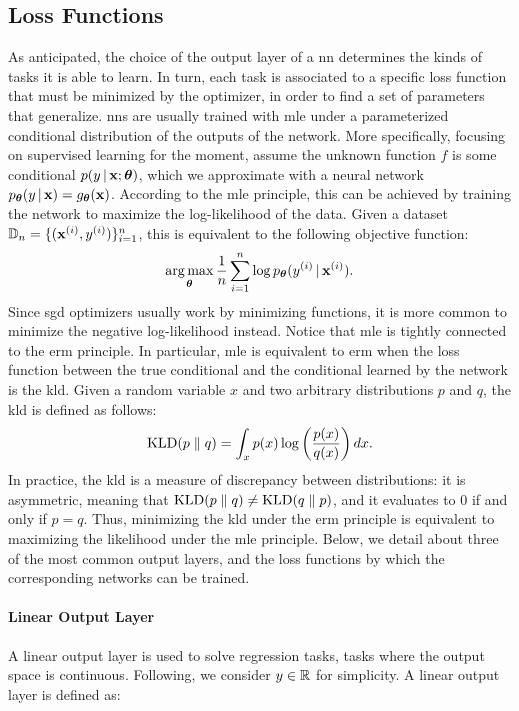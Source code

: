 \subsection{Loss Functions}\label{sec:loss}
As anticipated, the choice of the output layer of a \gls{nn} determines
the kinds of tasks it is able to learn. In turn, each task is associated to a specific loss function that must be minimized by the optimizer, in order to find a set of parameters that generalize. \glspl{nn}
are usually trained with \gls{mle} under a parameterized conditional distribution of the outputs of the network. More specifically, focusing on supervised learning for the moment, assume the unknown function $f$ is some conditional $p(y\given \Vector{x}; \Param)$, which we approximate with a neural network $p_{\Param}(y \given \Vector{x}) = g_{\Param}(\Vector{x})$. According to the \gls{mle} principle, this can be achieved by training the network to maximize the log-likelihood of the data. Given a dataset $\Data_n = \Set{(\VPattern{x}{i}, \Pattern{y}{i})}_{i=1}^n$, this is equivalent to the following objective function:
$$\argmax_{\Param} \frac{1}{n} \sum_{i=1}^n \log p_{\Param}(\Pattern{y}{i} \given \VPattern{x}{i}).$$
Since \gls{sgd} optimizers usually work by minimizing functions, it is more common to minimize the negative log-likelihood instead. Notice that \gls{mle} is tightly connected to the \gls{erm} principle. In particular, \gls{mle} is equivalent to \gls{erm} when the loss function between the true conditional and the conditional learned by the network is the \gls{kld}. Given a random variable $x$ and two arbitrary distributions $p$ and $q$, the \gls{kld} is defined as follows:
$$\mathrm{KLD}(p \;\Vert\; q) = \int_x p(x) \log\left( \frac{p(x)}{q(x)} \right) dx.$$
In practice, the \gls{kld} is a measure of discrepancy between distributions: it is asymmetric, meaning that $\mathrm{KLD}(p \;\Vert\; q) \neq \mathrm{KLD}(q \;\Vert\; p)$, and it evaluates to 0 if and only if $p = q$. Thus, minimizing the \gls{kld} under the \gls{erm} principle is equivalent to maximizing the likelihood under the \gls{mle} principle. Below, we detail about three of the most common output layers, and the loss functions by which the corresponding networks can be trained.

\paragraph{Linear Output Layer}
A linear output layer is used to solve regression tasks, \ie tasks where the output space is continuous. Following, we consider $y \in \mathbb{R}$ for simplicity. A linear output layer is defined as:

